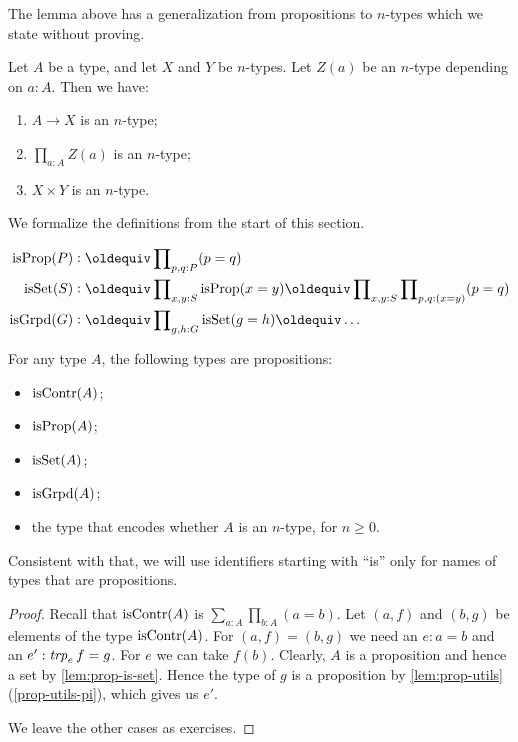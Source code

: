 The lemma above has a generalization from propositions to
$n$-types which we state without proving.

\begin{lemma}\label{lem:level-n-utils}
Let $A$ be a type, and let $X$ and $Y$ be $n$-types.
Let $Z(a)$ be an $n$-type depending on $a:A$. Then we have:

\begin{enumerate}
\item\label{level-n-utils-implication} $A\to X$ is an $n$-type;
\item\label{level-n-utils-pi} $\prod_{a:A} Z(a)$ is an $n$-type;
\item\label{level-n-utils-times} $X\times Y$ is an $n$-type.
\end{enumerate}
\end{lemma}

We formalize the definitions from the start of this section.
\begin{definition}\label{def:isSet}
\begin{align*}
\isprop(P) &\defeq\prod\nolimits_{p,q:P}(p=q)\\
\isset(S) &\defeq\prod\nolimits_{x,y:S}\isprop(x=y)\jdeq
                  \prod\nolimits_{x,y:S}\prod\nolimits_{p,q:(x=y)}(p=q)\\
\isgrpd(G) &\defeq\prod\nolimits_{g,h:G}\isset(g=h)\jdeq \ldots\\
\end{align*}
\end{definition}

\begin{lemma}\label{lem:isX-is-prop}
  For any type $A$, the following types are propositions:
  \begin{itemize}
    \item $\mathrm{isContr}(A)$;
    \item $\mathrm{isProp}(A)$;
    \item $\mathrm{isSet}(A)$;
    \item $\mathrm{isGrpd}(A)$;
    \item the type that encodes whether $A$ is an $n$-type, for $n \ge 0$.
  \end{itemize}
\end{lemma}

Consistent with that, we will use identifiers starting with ``is'' only for names of types that are propositions.

\begin{proof}
Recall that $\mathrm{isContr}(A)$ is $\sum_{a:A} \prod_{b:A} (a=b)$.
Let $(a,f)$ and $(b,g)$ be elements of the type $\mathrm{isContr}(A)$.
For $(a,f) = (b,g)$ we need an $e : a=b$ and an $e' : \mathop{\mathit{trp}_{e}} f = g$.
For $e$ we can take $f(b)$. Clearly, $A$ is a proposition and hence
a set by \cref{lem:prop-is-set}. Hence the type of $g$ is a proposition
by \cref{lem:prop-utils}(\ref{prop-utils-pi}), which gives us $e'$.

We leave the other cases as exercises.
\end{proof}

